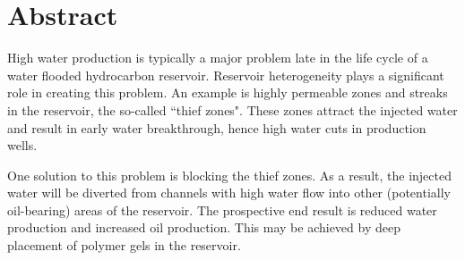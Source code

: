 





\clearpage{\thispagestyle{empty}\cleardoublepage}
\chapter*{Abstract}

High water production is typically a major problem late in the life cycle of a water flooded hydrocarbon reservoir. Reservoir heterogeneity plays a significant role in creating this problem. An example is highly permeable zones and streaks in the reservoir, the so-called ``thief zones". These zones attract the injected water and result in early water breakthrough, hence high water cuts in production wells. 

One solution to this problem is blocking the thief zones. As a result, the injected water will be diverted from channels with high water flow into other (potentially oil-bearing) areas of the reservoir. The prospective end result is reduced water production and increased oil production.  This may be achieved by deep placement of polymer gels in the reservoir. 


